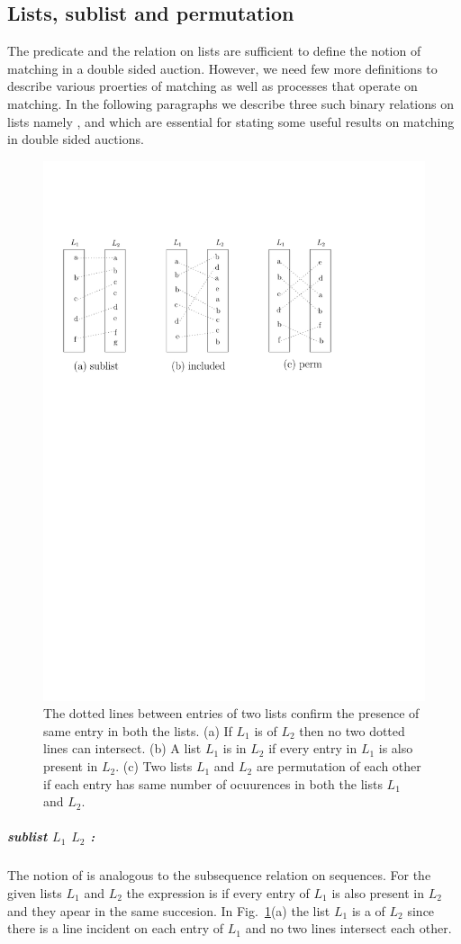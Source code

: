 \documentclass[a4paper,UKenglish,cleveref, autoref]{lipics-v2019}
\begin{document}
\subsection*{Lists, sublist and permutation}
The predicate  and the  relation on lists  are sufficient to define the notion of matching in a double sided auction. However, we need few more definitions to describe various proerties of matching as well as processes that operate on matching. In the following paragraphs we describe three such binary relations on lists namely ,  and  which are essential for stating some useful results on matching in double sided auctions. 

\begin{figure}[h!]
\centering
\includegraphics[width=.6\textwidth]{sub_inclu_perm.pdf}
\caption{The dotted lines between entries of two lists confirm the presence of same entry in both the lists. (a) If $L_1$ is  of $L_2$ then no two dotted lines can intersect. (b) A list $L_1$ is  in $L_2$ if every entry in $L_1$ is also present in $L_2$. (c) Two lists $L_1$ and $L_2$ are permutation of each other if each entry has same number of ocuurences in both the lists $L_1$ and $L_2$. }
\label{fig:list}
\end{figure}

\subparagraph*{sublist $L_1$ $L_2$ :} The notion of   is analogous to the subsequence relation on sequences. For the given lists $L_1$ and $L_2$ the expression   is   if every entry of $L_1$ is also present in $L_2$ and they apear in the same succesion.  In Fig.~\ref{fig:list}(a) the list $L_1$ is a  of $L_2$ since there is a line incident on each entry of $L_1$ and no two lines intersect each other. 
\end{document}

